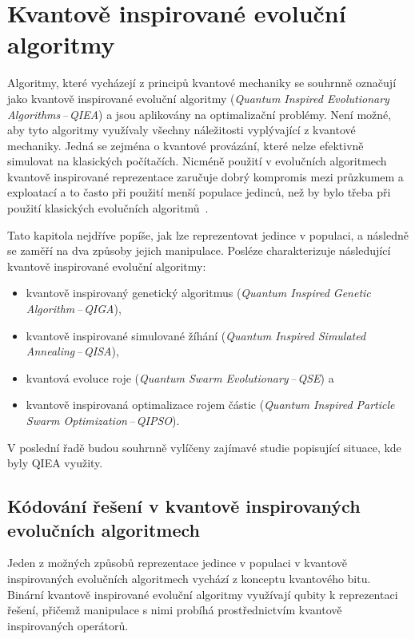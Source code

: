 \chapter{Kvantově inspirované evoluční algoritmy} \label{chapt:qiea}
Algoritmy, které vycházejí z principů kvantové mechaniky se souhrnně označují jako kvantově inspirované evoluční algoritmy (\emph{Quantum Inspired Evolutionary Algorithms\,--\,QIEA}) a jsou aplikovány na optimalizační problémy. 
Není možné, aby tyto algoritmy využívaly všechny náležitosti vyplývající z kvantové mechaniky. 
Jedná se zejména o kvantové provázání, které nelze efektivně simulovat na klasických počítačích. 
Nicméně použití v evolučních algoritmech kvantově inspirované reprezentace zaručuje dobrý kompromis mezi průzkumem a exploatací a to často při použití menší populace jedinců, než by bylo třeba při použití klasických evolučních algoritmů~\cite{NaturalComputing}.

Tato kapitola nejdříve popíše, jak lze reprezentovat jedince v populaci, a následně se zaměří na dva způsoby jejich manipulace. 
Posléze charakterizuje následující kvantově inspirované evoluční algoritmy:
\begin{itemize}
    \item kvantově inspirovaný genetický algoritmus (\emph{Quantum Inspired Genetic Algorithm\,--\,QIGA}),
    \item kvantově inspirované simulované žíhání (\emph{Quantum Inspired Simulated Annealing\,--\,QISA}),
    \item kvantová evoluce roje (\emph{Quantum Swarm Evolutionary\,--\,QSE}) a
    \item kvantově inspirovaná optimalizace rojem částic (\emph{Quantum Inspired Particle Swarm Optimization\,--\,QIPSO}).
\end{itemize}
V poslední řadě budou souhrnně vylíčeny zajímavé studie popisující situace, kde byly QIEA využity. 

\section{Kódování řešení v kvantově inspirovaných evolučních algoritmech}
Jeden z možných způsobů reprezentace jedince v populaci v kvantově inspirovaných evolučních algoritmech vychází z konceptu kvantového bitu. 
Binární kvantově inspirované evoluční algoritmy využívají qubity k reprezentaci řešení, přičemž manipulace s nimi probíhá prostřednictvím kvantově inspirovaných operátorů.

